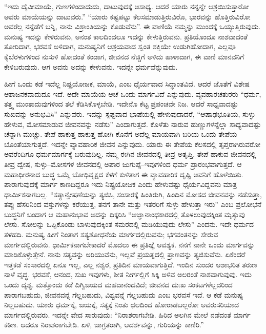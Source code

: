 “ಇದು ದೈವೀಮಾಯೆ, ಗುಣಗಳಿಂದಾದುದು, ದಾಟುವುದಕ್ಕೆ ಅಸಾಧ್ಯ. ಆದರೆ ಯಾರು ನನ್ನನ್ನೇ ಆಶ್ರಯಿಸುತ್ತಾರೋ ಅವರು ಮಾಯೆಯನ್ನು ದಾಟುವರು.” “ಯಾರು ಕಷ್ಟಪಟ್ಟು ಕೆಲಸಮಾಡುತ್ತಿರುವಿರೊ, ಭಾರವನ್ನು ಹೊತ್ತಿರುವಿರೋ ಅವರೆಲ್ಲ ನನ್ನೆಡೆಗೆ ಬನ್ನಿ, ನಾನು ವಿಶ್ರಾಂತಿಯನ್ನು ಕೊಡುವೆನು”. ಈ ವಾಣಿಯೆ ನಮ್ಮನ್ನು ಮುಂದಕ್ಕೆ ಒಯ್ಯುತ್ತಿರುವುದು. ಮನುಷ್ಯ ಇದನ್ನು ಕೇಳಿರುವನು, ಅನಂತ ಕಾಲದಿಂದಲೂ ಇದನ್ನು ಕೇಳುತ್ತಿರುವನು. ಪ್ರತಿಯೊಂದೂ ನಾಶವಾದಂತೆ ತೋರಿದಾಗ, ಭರವಸೆ ಅಳಿದಾಗ, ಮನುಷ್ಯನಿಗೆ ಆಶ್ರಯವಾದ ಸ್ವಂತ ಶಕ್ತಿಯೇ ಉಡುಗಿಹೋದಾಗ, ಎಲ್ಲವೂ ಕೈಬೆರಳುಗಳಿಂದ ನುಸುಳಿ ಹೋದಂತೆ ಕಂಡಾಗ, ಜೀವನದ ನೆಚ್ಚಿಗೆ ಅಳಿದು ಹಾಳಾದಾಗ, ಈ ವಾಣಿ ಮಾನವನಿಗೆ ಕೇಳಿಬರುವುದು. ಆಗ ಅವನು ಅದನ್ನು ಕೇಳುವನು. ಇದನ್ನೇ ಧರ್ಮವೆನ್ನುವುದು.

ಹೀಗೆ ಒಂದು ಕಡೆ ಇದೆಲ್ಲ ನಿಷ್ಪ್ರಯೋಜಕ, ಮಾಯೆ, ಎಂಬ ಧೈರ್ಯವಾದ ಸಿದ್ಧಾಂತವಿದೆ. ಆದರೆ ಜೊತೆಗೆ ವಿಶೇಷ ಆಶಾಜನಕವಾದುದೂ ಇದೆ. ಅದೇ ಮಾಯೆಯ ಆಚೆ ಒಂದು ಮಾರ್ಗವಿದೆ ಎನ್ನುವುದು. ವ್ಯವಹಾರಚತುರರು “ಧರ್ಮ, ತತ್ತ್ವ ಮುಂತಾದುವುಗಳಿಂದ ತಲೆ ಕೆಡಿಸಿಕೊಳ್ಳಬೇಡಿ. ಇದೇನೊ ಕೆಟ್ಟ ಪ್ರಪಂಚವೇ ನಿಜ. ಆದರೆ ಸಾಧ್ಯವಾದಷ್ಟು ಸುಖವನ್ನು ಅನುಭವಿಸಿ” ಎನ್ನುವರು. ಇದನ್ನು ಸ್ಪಷ್ಟವಾದ ಭಾಷೆಯಲ್ಲಿ ಹೇಳುವುದಾದರೆ, “ಆಷಾಢಭೂತಿಯ, ಸುಳ್ಳು ಹೇಳುವ, ಮೋಸಮಾಡುವ ಜೀವನವನ್ನು ನಡೆಸು” ಎಂದಾಗುತ್ತದೆ. ಕೊಳೆತು ನಾರುವ ಹುಣ್ಣುಗಳನ್ನೆಲ್ಲಾ ಸಾಧ್ಯವಾದಷ್ಟು ಚೆನ್ನಾಗಿ ಮುಚ್ಚು. ತೇಪೆ ಹಾಕುತ್ತ ಹಾಕುತ್ತ ಹೋಗಿ ಕೊನೆಗೆ ಅದೆಲ್ಲ ಮಾಯವಾಗಿ ಬರಿಯ ಒಂದು ತೇಪೆಯ ಬೊಂತೆಯಾಗುತ್ತದೆ. ಇದನ್ನೇ ವ್ಯಾವಹಾರಿಕ ಜೀವನ ಎನ್ನುವುದು. ಯಾರು ಈ ತೇಪೆಯ ಕೆಲಸದಲ್ಲಿ ತೃಪ್ತರಾಗಿರುವರೋ ಅವರೆಂದಿಗೂ ಧರ್ಮಮಾರ್ಗಕ್ಕೆ ಬರುವುದಿಲ್ಲ. ನಮ್ಮ ಈಗಿನ ಜೀವನದಲ್ಲಿ ತೀವ್ರ ಅತೃಪ್ತಿ, ತೇಪೆ ಹಾಕುವ ಜೀವನದಲ್ಲಿ ತೀವ್ರ ದ್ವೇಷ, ಸುಳ್ಳು–ಮೋಸಗಳ ಜೀವನದಲ್ಲಿ ಅಪಾರ ಜುಗುಪ್ಸೆ–ಇವುಗಳಿಂದ ಧರ್ಮ ಪ್ರಾರಂಭವಾಗುತ್ತದೆ. ಆ ಮಹಾಧೀರನಾದ ಬುದ್ಧ ಒಮ್ಮೆ ಬೋಧಿವೃಕ್ಷದ ಕೆಳಗೆ ಕುಳಿತಾಗ ಈ ವ್ಯಾವಹಾರಿಕ ದೃಷ್ಟಿ ಅವನಿಗೆ ಹೊಳೆಯಿತು. ಪಾರಾಗುವುದಕ್ಕೆ ಮಾರ್ಗ ಕಾಣದಿದ್ದರೂ ಇದು ನಿಷ್ಪ್ರಯೋಜಕ ಎಂದು ಹೇಳುವಷ್ಟು ಧೈರ್ಯವಿದ್ದವನು ಮಾತ್ರ ಧಾರ್ಮಿಕನಾಗಬಲ್ಲ. “ಸತ್ಯಾನ್ವೇಷಣೆಯನ್ನು ತ್ಯಜಿಸಿ, ಸಂಸಾರಕ್ಕೆ ಹಿಂತಿರುಗಿ, ಹಿಂದಿನ ಮೋಸದ ಜೀವನವನ್ನು ನಡೆಸುತ್ತಾ, ತಪ್ಪು ಹೆಸರಿನಿಂದ ವಸ್ತುಗಳನ್ನು ಕರೆಯುತ್ತ, ತನಗೆ ತಾನೇ ಮತ್ತು ಇತರರಿಗೆ ಸುಳ್ಳು ಹೇಳುತ್ತಾ ಇರು” ಎಂಬ ಪ್ರಲೋಭನೆ ಬುದ್ಧನಿಗೆ ಬಂದಾಗ ಆ ಮಹಾನುಭಾವ ಅದನ್ನು ಧಿಕ್ಕರಿಸಿ “ಅಜ್ಞಾನಾಂಧಕಾರದಲ್ಲಿ ತೊಳಲುವುದಕ್ಕಿಂತ ಮೃತ್ಯುವು ಲೇಸು. ಸೋಲನ್ನು ಒಪ್ಪಿಕೊಂಡು ಬಾಳುವುದಕ್ಕಿಂತ ಸಮರದಲ್ಲಿ ಮಡಿಯುವುದು ಲೇಸು” ಎಂದನು. ಇದೇ ಧರ್ಮದ ತಳಹದಿ. ಮನುಷ್ಯ ಹೀಗೆ ನಿಂತಾಗ ಸತ್ಯಶೋಧನೆಯ ಮಾರ್ಗದಲ್ಲಿರುವನು; ಭಗವಂತನನ್ನು ಸೇರುವ ಮಾರ್ಗದಲ್ಲಿರುವನು. ಧಾರ್ಮಿಕನಾಗಬೇಕಾದರೆ ಮೊದಲು ಈ ಪ್ರತಿಜ್ಞೆ ಆವಶ್ಯಕ. ನನಗೆ ನಾನೇ ಒಂದು ಮಾರ್ಗವನ್ನು ಮಾಡಿಕೊಳ್ಳುತ್ತೇನೆ. ನಾನು ಸತ್ಯವನ್ನು ಅರಿಯುವೆನು, ಇಲ್ಲವೆ ಪ್ರಯತ್ನದಲ್ಲಿ ಪ್ರಾಣವನ್ನು ತ್ಯಜಿಸುವೆನು. ಏಕೆಂದರೆ ಇತ್ತಕಡೆ ಸಂಸಾರದಲ್ಲಿ ಏನೂ ಇಲ್ಲ, ಎಲ್ಲ ನಶ್ವರ, ಪ್ರತಿದಿನ ಮಾಯವಾಗುತ್ತಿದೆ. ಇಂದಿನ ಸುಂದರ ಆಶಾಭರಿತ ತರುಣ ನಾಳೆ ವೃದ್ಧ. ಭರವಸೆ, ಆನಂದ, ಸುಖ ಇವುಗಳು, ಶೀತ ನೀರ್ಗಲ್ಲಿಗೆ ಸಿಕ್ಕಿ ಅಳಿವ ಅಲರಂತೆ ನಾಶವಾಗುವುವು. ಇದು ಒಂದು ದೃಶ್ಯ. ಮತ್ತೊಂದು ಕಡೆ ದಿಗ್ವಿಜಯದ ಮಹದಾನಂದವಿದೆ; ಜೀವನದ ದುಃಖ ಸಂಕಟಗಳೆಲ್ಲದರಿಂದ ಪಾರಾಗಬಹುದು, ಜೀವನವನ್ನೆ ಗೆಲ್ಲಬಹುದು, ವಿಶ್ವವನ್ನೆ ಗೆಲ್ಲಬಹುದು ಎಂಬ ಭರವಸೆ ಇದೆ. ಆ ಕಡೆ ಮನುಷ್ಯ ನಿಲ್ಲಬಹುದು. ಯಾರು ಧರ್ಮಕ್ಕೆ, ಜಯಕ್ಕೆ, ಸತ್ಯಕ್ಕೆ ನಿಂತು ಛಲದಿಂದ ಹೋರಾಡಬಲ್ಲರೋ ಅವರು\break ಸರಿಯಾದ ಮಾರ್ಗದಲ್ಲಿರುವರು. ಇದನ್ನೇ ವೇದ ಸಾರುವುದು: “ನಿರಾಶರಾಗಬೇಡಿ. ಹಿರಿದ ಅಲಗಿನ ಮೇಲೆ ನಡೆದಂತೆ ಮಾರ್ಗ ಕಠಿಣ. ಆದರೂ ನಿರಾಶರಾಗಬೇಡಿ. ಏಳಿ, ಜಾಗ್ರತರಾಗಿ, ಆದರ್ಶವನ್ನು, ಗುರಿಯನ್ನು ಕಾಣಿರಿ.”

